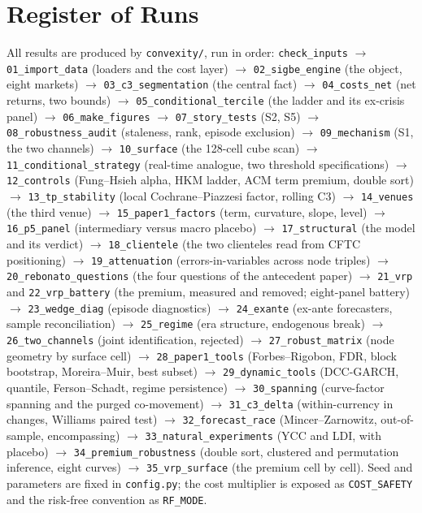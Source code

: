 \documentclass[11pt]{article}
\begin{document}
\section{Register of Runs}\label{sec:register}
All results are produced by \texttt{convexity/}, run in order:
\texttt{check\_inputs} $\to$ \texttt{01\_import\_data} (loaders and the cost layer) $\to$
\texttt{02\_sigbe\_engine} (the object, eight markets) $\to$ \texttt{03\_c3\_segmentation} (the central
fact) $\to$ \texttt{04\_costs\_net} (net returns, two bounds) $\to$
\texttt{05\_conditional\_tercile} (the ladder and its ex-crisis panel) $\to$ \texttt{06\_make\_figures}
$\to$ \texttt{07\_story\_tests} (S2, S5) $\to$ \texttt{08\_robustness\_audit} (staleness, rank,
episode exclusion) $\to$ \texttt{09\_mechanism} (S1, the two channels) $\to$ \texttt{10\_surface} (the
128-cell cube scan) $\to$ \texttt{11\_conditional\_strategy} (real-time analogue, two threshold
specifications) $\to$ \texttt{12\_controls} (Fung--Hsieh alpha, HKM ladder, ACM term premium, double
sort) $\to$ \texttt{13\_tp\_stability} (local Cochrane--Piazzesi factor, rolling C3) $\to$
\texttt{14\_venues} (the third venue) $\to$ \texttt{15\_paper1\_factors} (term, curvature, slope,
level) $\to$ \texttt{16\_p5\_panel} (intermediary versus macro placebo) $\to$
\texttt{17\_structural} (the model and its verdict) $\to$ \texttt{18\_clientele} (the two clienteles read from CFTC positioning) $\to$ \texttt{19\_attenuation} (errors-in-variables across node triples) $\to$ \texttt{20\_rebonato\_questions} (the four questions of the antecedent paper) $\to$
\texttt{21\_vrp} and \texttt{22\_vrp\_battery} (the premium, measured and removed; eight-panel battery)
$\to$ \texttt{23\_wedge\_diag} (episode diagnostics) $\to$ \texttt{24\_exante} (ex-ante forecasters,
sample reconciliation) $\to$ \texttt{25\_regime} (era structure, endogenous break) $\to$
\texttt{26\_two\_channels} (joint identification, rejected) $\to$ \texttt{27\_robust\_matrix} (node
geometry by surface cell) $\to$ \texttt{28\_paper1\_tools} (Forbes--Rigobon, FDR, block bootstrap,
Moreira--Muir, best subset) $\to$ \texttt{29\_dynamic\_tools} (DCC-GARCH, quantile, Ferson--Schadt,
regime persistence) $\to$ \texttt{30\_spanning} (curve-factor spanning and the purged co-movement)
$\to$ \texttt{31\_c3\_delta} (within-currency in changes, Williams paired test) $\to$
\texttt{32\_forecast\_race} (Mincer--Zarnowitz, out-of-sample, encompassing) $\to$
\texttt{33\_natural\_experiments} (YCC and LDI, with placebo) $\to$ \texttt{34\_premium\_robustness}
(double sort, clustered and permutation inference, eight curves) $\to$ \texttt{35\_vrp\_surface} (the
premium cell by cell). Seed and parameters are fixed in
\texttt{config.py}; the cost multiplier is exposed as \texttt{COST\_SAFETY} and the risk-free
convention as \texttt{RF\_MODE}.
\end{document}
